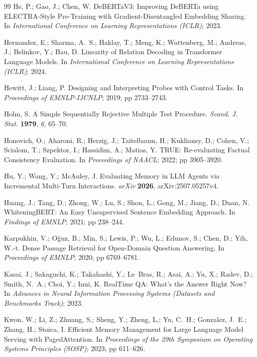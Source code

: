 \documentclass[journal=jcisd8,manuscript=article]{achemso}
\begin{document}
\begin{thebibliography}{99}
 He, P.; Gao, J.; Chen, W. DeBERTaV3: Improving DeBERTa using ELECTRA-Style Pre-Training with Gradient-Disentangled Embedding Sharing. In \emph{International Conference on Learning Representations (ICLR)}; 2023.

 Hernandez, E.; Sharma, A.~S.; Haklay, T.; Meng, K.; Wattenberg, M.; Andreas, J.; Belinkov, Y.; Bau, D. Linearity of Relation Decoding in Transformer Language Models. In \emph{International Conference on Learning Representations (ICLR)}; 2024.

 Hewitt, J.; Liang, P. Designing and Interpreting Probes with Control Tasks. In \emph{Proceedings of EMNLP-IJCNLP}; 2019; pp 2733--2743.

 Holm, S. A Simple Sequentially Rejective Multiple Test Procedure. \emph{Scand. J. Stat.} \textbf{1979}, \emph{6}, 65--70.

 Honovich, O.; Aharoni, R.; Herzig, J.; Taitelbaum, H.; Kukliansy, D.; Cohen, V.; Scialom, T.; Szpektor, I.; Hassidim, A.; Matias, Y. TRUE: Re-evaluating Factual Consistency Evaluation. In \emph{Proceedings of NAACL}; 2022; pp 3905--3920.

 Hu, Y.; Wang, Y.; McAuley, J. Evaluating Memory in LLM Agents via Incremental Multi-Turn Interactions. \emph{arXiv} \textbf{2026}, arXiv:2507.05257v4.

 Huang, J.; Tang, D.; Zhong, W.; Lu, S.; Shou, L.; Gong, M.; Jiang, D.; Duan, N. WhiteningBERT: An Easy Unsupervised Sentence Embedding Approach. In \emph{Findings of EMNLP}; 2021; pp 238--244.

 Karpukhin, V.; O\u{g}uz, B.; Min, S.; Lewis, P.; Wu, L.; Edunov, S.; Chen, D.; Yih, W.-t. Dense Passage Retrieval for Open-Domain Question Answering. In \emph{Proceedings of EMNLP}; 2020; pp 6769--6781.

 Kasai, J.; Sakaguchi, K.; Takahashi, Y.; Le~Bras, R.; Asai, A.; Yu, X.; Radev, D.; Smith, N.~A.; Choi, Y.; Inui, K. RealTime QA: What's the Answer Right Now? In \emph{Advances in Neural Information Processing Systems (Datasets and Benchmarks Track)}; 2023.

 Kwon, W.; Li, Z.; Zhuang, S.; Sheng, Y.; Zheng, L.; Yu, C.~H.; Gonzalez, J.~E.; Zhang, H.; Stoica, I. Efficient Memory Management for Large Language Model Serving with PagedAttention. In \emph{Proceedings of the 29th Symposium on Operating Systems Principles (SOSP)}; 2023; pp 611--626.


\end{thebibliography}
\end{document}
